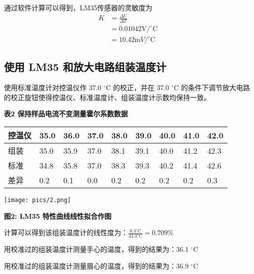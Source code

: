 \documentclass[10pt,a4paper]{article}
\makeatletter
\newenvironment{figurehere}
{\def\@captype{figure}}
{}
\newenvironment{tablehere}
{\def\@captype{table}}
{}
\makeatother
\begin{document}
	通过软件计算可以得到，LM35传感器的灵敏度为
	$$
	\begin{aligned}
		K &= \frac{\Delta U}{\Delta T} \\
		&= 0.01042 \mathrm V/ ^\circ \mathrm C\\
		&= 10.42 \mathrm mV/ ^\circ \mathrm C
	\end{aligned}
	$$



	\subsection{使用 LM35 和放大电路组装温度计}

	使用标准温度计对控温仪作 37.0 $^\circ \mathrm C$ 的校正，并在 37.0 $^\circ \mathrm C$ 的条件下调节放大电路的校正旋钮使得控温仪、标准温度计、组装温度计示数均保持一致。

	\begin{tablehere}
		\caption*{\bf 表2 保持样品电流不变测量霍尔系数数据}
		\noindent	
		\begin{center}
			\begin{tabularx}{0.95\textwidth}{|Y|Y|Y|Y|Y|Y|Y|Y|Y|}
				\hline
				控温仪 & 35.0 & 36.0 & 37.0 & 38.0 & 39.0 & 40.0 & 41.0 & 42.0 \\ \hline
				组装  & 35.0 & 35.9 & 37.0 & 38.1 & 39.1 & 40.0 & 41.2 & 42.3 \\ \hline
				标准  & 34.8 & 35.8 & 37.0 & 38.3 & 39.3 & 40.2 & 41.4 & 42.6 \\ \hline
				差异  & 0.2  & 0.1  & 0.0  & 0.2  & 0.2  & 0.2  & 0.2  & 0.3  \\ \hline
			\end{tabularx}
			\vspace*{1em}
		\end{center}
	\end{tablehere}

	\begin{figurehere}
		\centering
		\texttt{[image: pics/2.png]}
		\caption*{\bf 图2: LM35 特性曲线线性拟合作图}
	\end{figurehere}

	计算可以得到该组装温度计的线性度为：$\frac{0.3 ^\circ \mathrm C}{42.3 ^\circ \mathrm C} = 0.709 \%$

	用校准过的组装温度计测量手心的温度，得到的结果为：36.1 $^\circ \mathrm C$

	用校准过的组装温度计测量眉心的温度，得到的结果为：36.9 $^\circ \mathrm C$
\end{document}
